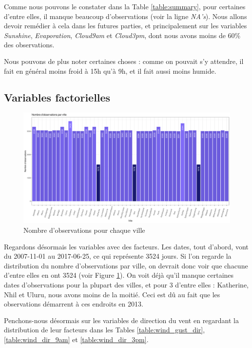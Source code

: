 \documentclass{article}
\begin{document}
Comme nous pouvons le constater dans la Table \ref{table:summary}, pour certaines d'entre elles, il manque beaucoup d'observations (voir la ligne \emph{NA's}). Nous allons devoir remédier à cela dans les futures parties, et principalement sur les variables \emph{Sunshine}, \emph{Evaporation}, \emph{Cloud9am} et \emph{Cloud3pm}, dont nous avons moins de 60\% des observations.

Nous pouvons de plus noter certaines choses : comme on pouvait s'y attendre, il fait en général moins froid à 15h qu'à 9h, et il fait aussi moins humide. 

\subsection{Variables factorielles}

\begin{figure}[H]
    \centering
    \includegraphics[width=\textwidth]{Images/hist_observations_cities.pdf}
    \caption{Nombre d'observations pour chaque ville}
    \label{fig:obs_per_cities}
\end{figure}

Regardons désormais les variables avec des facteurs. Les dates, tout d'abord, vont du 2007-11-01 au 2017-06-25, ce qui représente 3524 jours. Si l'on regarde la distribution du nombre d'observations par ville, on devrait donc voir que chacune d'entre elles en ont 3524 (voir Figure \ref{fig:obs_per_cities}). On voit déjà qu'il manque certaines dates d'observations pour la plupart des villes, et pour 3 d'entre elles : Katherine, Nhil et Uluru, nous avons moins de la moitié. Ceci est dû au fait que les observations démarrent à ces endroits en 2013.

Penchons-nous désormais sur les variables de direction du vent en regardant la distribution de leur facteurs dans les Tables \ref{table:wind_gust_dir}, \ref{table:wind_dir_9am} et \ref{table:wind_dir_3pm}.
\end{document}
